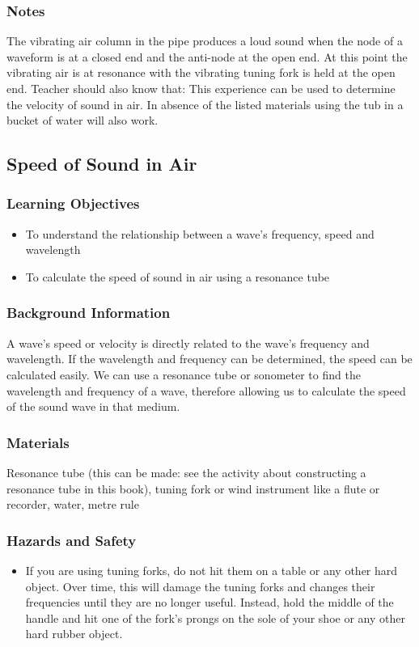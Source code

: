 \subsubsection*{Notes}
The vibrating air column in the pipe produces a loud sound when the node of a waveform is at a closed end and the anti-node at the open end. At this point the vibrating air is at resonance with the vibrating tuning fork is held at the open end. 
Teacher should also know that: 
This experience can be used to determine the velocity of sound in air. In absence of the listed materials using the tub in a bucket of water will also work.  

\subsection{Speed of Sound in Air}

\subsubsection*{Learning Objectives}
\begin{itemize}
\item{To understand the relationship between a wave's frequency, speed and wavelength} 
\item{To calculate the speed of sound in air using a resonance tube} 
\end{itemize}

\subsubsection*{Background Information}
A wave's speed or velocity is directly related to the wave's frequency and wavelength. If the wavelength and frequency can be determined, the speed can be calculated easily. We can use a resonance tube or sonometer to find the wavelength and frequency of a wave, therefore allowing us to calculate the speed of the sound wave in that medium.  

\subsubsection*{Materials}
Resonance tube (this can be made: see the activity about constructing a resonance tube in this book), tuning fork or wind instrument like a flute or recorder, water, metre rule

\subsubsection*{Hazards and Safety}
\begin{itemize}
\item{If you are using tuning forks, do not hit them on a table or any other hard object. Over time, this will damage the tuning forks and changes their frequencies until they are no longer useful. Instead, hold the middle of the handle and hit one of the fork's prongs on the sole of your shoe or any other hard rubber object.} 
\end{itemize}

